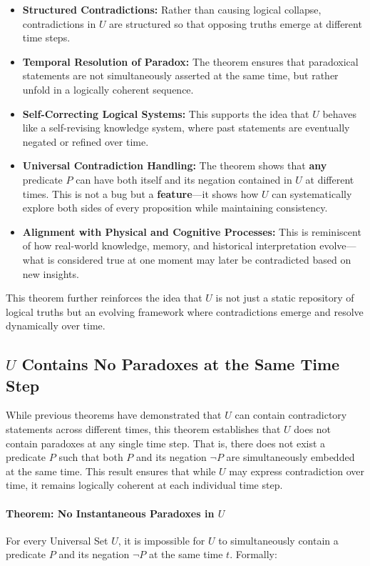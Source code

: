 \documentclass[12pt]{article}
\begin{document}
\begin{itemize}
    \item \textbf{Structured Contradictions:} Rather than causing logical collapse, contradictions in \( U \) are structured so that opposing truths emerge at different time steps.
    \item \textbf{Temporal Resolution of Paradox:} The theorem ensures that paradoxical statements are not simultaneously asserted at the same time, but rather unfold in a logically coherent sequence.
    \item \textbf{Self-Correcting Logical Systems:} This supports the idea that \( U \) behaves like a self-revising knowledge system, where past statements are eventually negated or refined over time.
    \item \textbf{Universal Contradiction Handling:} The theorem shows that \textbf{any} predicate \( P \) can have both itself and its negation contained in \( U \) at different times. This is not a bug but a \textbf{feature}—it shows how \( U \) can systematically explore both sides of every proposition while maintaining consistency.
    \item \textbf{Alignment with Physical and Cognitive Processes:} This is reminiscent of how real-world knowledge, memory, and historical interpretation evolve—what is considered true at one moment may later be contradicted based on new insights.
\end{itemize}

This theorem further reinforces the idea that \( U \) is not just a static repository of logical truths but an evolving framework where contradictions emerge and resolve dynamically over time.


\subsection{\( U \) Contains No Paradoxes at the Same Time Step}

While previous theorems have demonstrated that \( U \) can contain contradictory statements across different times, this theorem establishes that \( U \) does not contain paradoxes at any single time step. That is, there does not exist a predicate \( P \) such that both \( P \) and its negation \( \neg P \) are simultaneously embedded at the same time. This result ensures that while \( U \) may express contradiction over time, it remains logically coherent at each individual time step.

\paragraph{Theorem: No Instantaneous Paradoxes in \( U \)}
For every Universal Set \( U \), it is impossible for \( U \) to simultaneously contain a predicate \( P \) and its negation \( \neg P \) at the same time \( t \). Formally:
\end{document}

